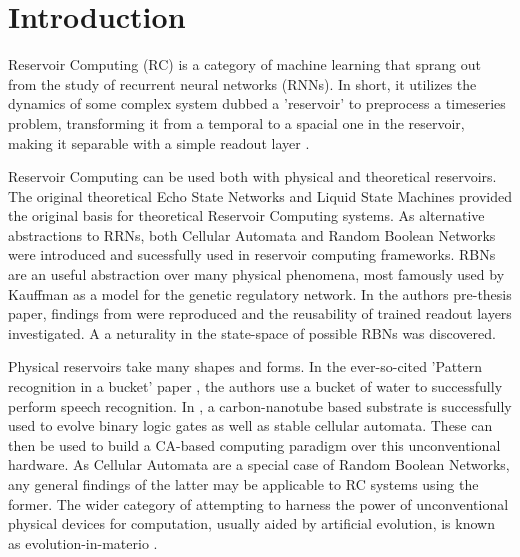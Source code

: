 \chapter{Introduction}

Reservoir Computing (RC) is a category of machine learning that sprang out from the study of recurrent neural networks (RNNs).
In short, it utilizes the dynamics of some complex system dubbed a 'reservoir' to preprocess a timeseries problem,
transforming it from a temporal to a spacial one in the reservoir,
making it separable with a simple readout layer \cite{lukovsevivcius2012reservoir}.

Reservoir Computing can be used both with physical and theoretical reservoirs.
The original theoretical Echo State Networks \cite{jaeger2002adaptive} and Liquid State Machines \cite{natschlager2002liquid} provided the original basis for theoretical Reservoir Computing systems.
As alternative abstractions to RRNs,
both Cellular Automata \cite{yilmaz2014reservoir} and Random Boolean Networks \cite{rbn-reservoir} were introduced and sucessfully used in reservoir computing frameworks.
RBNs \cite{gershenson2004introduction} are an useful abstraction over many physical phenomena,
most famously used by Kauffman \cite{kauffman1969metabolic} as a model for the genetic regulatory network.
In the authors pre-thesis paper,
findings from \cite{rbn-reservoir} were reproduced and the reusability of trained readout layers investigated.
A a neturality in the state-space of possible RBNs was discovered.

Physical reservoirs take many shapes and forms.
In the ever-so-cited 'Pattern recognition in a bucket' paper \cite{fernando2003pattern},
the authors use a bucket of water to successfully perform speech recognition.
In \cite{farstad2015evolving},
a carbon-nanotube based substrate is successfully used to evolve binary logic gates as well as stable cellular automata.
These can then be used to build a CA-based computing paradigm over this unconventional hardware.
As Cellular Automata are a special case of Random Boolean Networks,
any general findings of the latter may be applicable to RC systems using the former.
The wider category of attempting to harness the power of unconventional physical devices for computation,
usually aided by artificial evolution,
is known as evolution-in-materio \cite{miller2002evolution}.

